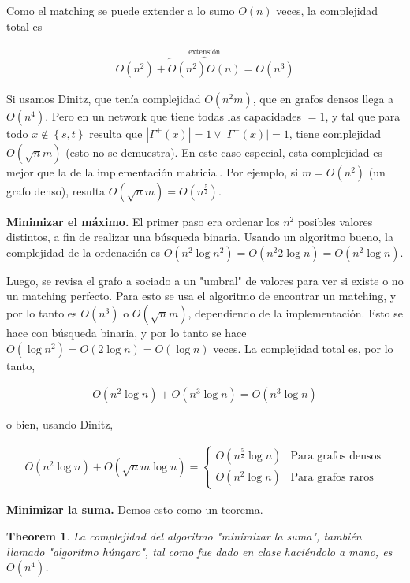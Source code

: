 \documentclass[a4paper]{article}
\newtheorem{theorem}{Theorem}
\newtheorem{theorem}{Theorem}
\begin{document}
Como el matching se puede extender a lo sumo $O(n)$ veces, la complejidad total es 

\begin{align*}
    O(n^2) + \overbrace{ O(n^2)O(n) }^{\text{extensión}} = O(n^3)
\end{align*}

Si usamos Dinitz, que tenía complejidad $O(n^2 m)$, que en grafos densos llega
a $O(n^4)$. Pero en un network que tiene todas las capacidades $=1$, y tal que 
para todo $x \not\in \left\{ s, t \right\} $ resulta que $|\Gamma^{+}(x)|=1 \lor
|\Gamma^{-}(x)| = 1$, tiene complejidad $O(\sqrt{n} m) $ (esto no se demuestra). En 
este caso especial, esta complejidad es mejor que la de la implementación
matricial. Por ejemplo, si $m = O(n^2)$ (un grafo denso), resulta $O(\sqrt{n}m)
= O(n^{\frac{5}{2}}) $.

\textbf{Minimizar el máximo.} El primer paso era ordenar los $n^2$ posibles
valores distintos, a fin de realizar una búsqueda binaria. Usando un algoritmo
bueno, la complejidad de la ordenación es $O(n^2 \log n^2) = O(n^2 2 \log n) =
O(n^2 \log n)$. 

Luego, se revisa el grafo a sociado a un "umbral" de valores  para ver si
existe o no un matching perfecto. Para esto se usa el algoritmo de encontrar un
matching, y por lo tanto es $O(n^3)$ o $O(\sqrt{n}m) $, dependiendo de la
implementación. Esto se hace con búsqueda binaria, y por lo tanto se hace 
$O(\log n^2) = O(2 \log n) = O(\log n)$ veces. La complejidad total es, por lo tanto, 

\begin{align*}
    O(n^2 \log n) + O(n^3 \log n) = O(n^3 \log n)
\end{align*}

o bien, usando Dinitz,

\begin{align*}
    O(n^2 \log n) + O(\sqrt{n} m \log n ) = \begin{cases}
        O(n^{\frac{5}{2}} \log n) & \text{Para grafos densos} \\ 
        O(n^2 \log n) & \text{Para grafos raros}
    \end{cases}
\end{align*}

\textbf{Minimizar la suma.} Demos esto como un teorema. 

\begin{theorem}
    La complejidad del algoritmo "minimizar la suma", también llamado
    "algoritmo húngaro", tal como fue dado en clase haciéndolo a mano,
    es $O(n^4)$.
\end{theorem}
\end{document}
